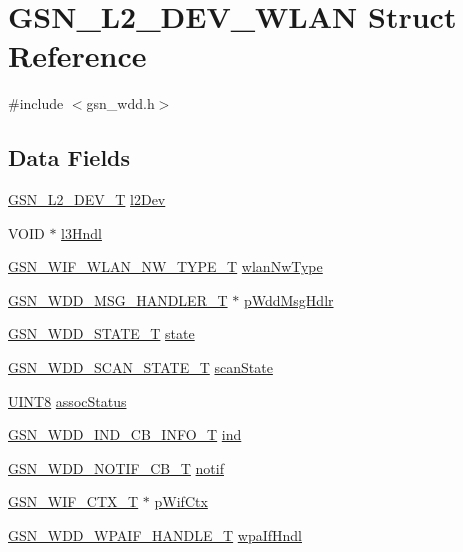\hypertarget{a00108}{
\section{GSN\_\-L2\_\-DEV\_\-WLAN Struct Reference}
\label{a00108}
}


{\ttfamily \#include $<$gsn\_\-wdd.h$>$}

\subsection*{Data Fields}
\begin{DoxyCompactItemize}
\item 
\hyperlink{a00107}{GSN\_\-L2\_\-DEV\_\-T} \hyperlink{a00108_aa0cd5425da571e5b7ad6c6b116e5a4ed}{l2Dev}
\item 
VOID $\ast$ \hyperlink{a00108_aaeab14901a77de33349412601376b127}{l3Hndl}
\item 
\hyperlink{a00677_gabc852e0cb262314c5f307a3e9802921e}{GSN\_\-WIF\_\-WLAN\_\-NW\_\-TYPE\_\-T} \hyperlink{a00108_a611759f3eaa5817846fb74212f7aaea5}{wlanNwType}
\item 
\hyperlink{a00279}{GSN\_\-WDD\_\-MSG\_\-HANDLER\_\-T} $\ast$ \hyperlink{a00108_a6978c51a66d7b07a4fa1a13f9af82548}{pWddMsgHdlr}
\item 
\hyperlink{a00677_ga3a801c5847114c1bb6dc9cc1a0c5837e}{GSN\_\-WDD\_\-STATE\_\-T} \hyperlink{a00108_a2d16f70cd8cd6b95e83a030f7091c4e2}{state}
\item 
\hyperlink{a00603_a940af0328a2568d0750d618f5c8f141e}{GSN\_\-WDD\_\-SCAN\_\-STATE\_\-T} \hyperlink{a00108_a9851bddc6b7ca4b4cffb8b3babf00448}{scanState}
\item 
\hyperlink{a00660_gab27e9918b538ce9d8ca692479b375b6a}{UINT8} \hyperlink{a00108_aefbdac2d3871268bf15bf14ec0130f96}{assocStatus}
\item 
\hyperlink{a00275}{GSN\_\-WDD\_\-IND\_\-CB\_\-INFO\_\-T} \hyperlink{a00108_aa08a8fd32e70140a0683e87a5e2ce284}{ind}
\item 
\hyperlink{a00281}{GSN\_\-WDD\_\-NOTIF\_\-CB\_\-T} \hyperlink{a00108_ad0e2e453e7dd75d17b37b4a5267f616c}{notif}
\item 
\hyperlink{a00323}{GSN\_\-WIF\_\-CTX\_\-T} $\ast$ \hyperlink{a00108_aa8e90d3c80ca98d22454e0840b8cf2d2}{pWifCtx}
\item 
\hyperlink{a00604_abe0c512b373bf02e6fb6185079cb6f0c}{GSN\_\-WDD\_\-WPAIF\_\-HANDLE\_\-T} \hyperlink{a00108_a5778d8bf3e35749d4a8e82de4de2af4c}{wpaIfHndl}
\item 

\end{DoxyCompactItemize}
